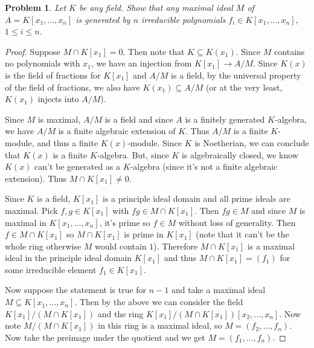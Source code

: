 \documentclass{article}
\newtheorem{problem}{Problem}
\begin{document}
\begin{problem}
\label{fieldmax}
Let $K$ be any field. Show that any maximal ideal $M$ of $A = K[x_1, \dots , x_n]$ is generated by $n$ irreducible polynomials $f_i \in K[x_1, \dots , x_n]$, $1 \leq i \leq n$.
\end{problem}
\begin{proof}
Suppose $M \cap K[x_1] = 0$. Then note that $K \subseteq K(x_1)$. Since $M$ contains no polynomials with $x_1$, we have an injection from $K[x_1] \to A/M$. Since $K(x)$ is the field of fractions for $K[x_1]$ and $A/M$ is a field, by the universal property of the field of fractions, we also have $K(x_1) \subseteq A/M$ (or at the very least, $K(x_1)$ injects into $A/M$).

Since $M$ is maximal, $A/M$ is a field and since $A$ is a finitely generated $K$-algebra, we have $A/M$ is a finite algebraic extension of $K$. Thus $A/M$ is a finite $K$-module, and thus a finite $K(x)$-module. Since $K$ is Noetherian, we can conclude that $K(x)$ is a finite $K$-algebra. But, since $K$ is algebraically closed, we know $K(x)$ can't be generated as a $K$-algebra (since it's not a finite algebraic extension). Thus $M \cap K[x_1] \neq 0$.

Since $K$ is a field, $K[x_1]$ is a principle ideal domain and all prime ideals are maximal. Pick $f, g \in K[x_1]$ with $fg \in M \cap K[x_1]$. Then $fg \in M$ and since $M$ is maximal in $K[x_1, \dots , x_n]$, it's prime so $f \in M$ without loss of generality. Then $f \in M \cap K[x_1]$ so $M \cap K[x_1]$ is prime in $K[x_1]$ (note that it can't be the whole ring otherwise $M$ would contain $1$). Therefore $M \cap K[x_1]$ is a maximal ideal in the principle ideal domain $K[x_1]$ and thus $M \cap K[x_1] = (f_1)$ for some irreducible element $f_1 \in K[x_1]$.

Now suppose the statement is true for $n-1$ and take a maximal ideal $M \subseteq K[x_1, \dots , x_n]$. Then by the above we can consider the field $K[x_1]/(M \cap K[x_1])$ and the ring $K[x_1]/(M \cap K[x_1]) [x_2, \dots , x_n]$. Now note $M/(M \cap K[x_1])$ in this ring is a maximal ideal, so $M = (f_2, \dots , f_n)$. Now take the preimage under the quotient and we get $M = (f_1, \dots , f_n)$.
\end{proof}
\end{document}

